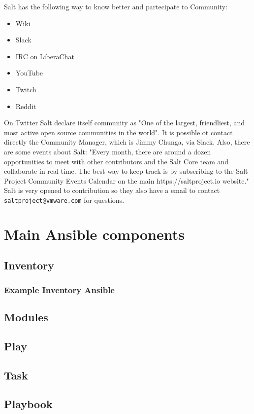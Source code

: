 \documentclass[12pt,a4paper,openright,twoside]{book}
\begin{document}
Salt has the following way to know better and partecipate to Community:
\begin{itemize}
    \item Wiki
    \item Slack
    \item IRC on LiberaChat
    \item YouTube
    \item Twitch
    \item Reddit
\end{itemize}
On Twitter Salt declare itself community as "One of the largest, friendliest, and most active open source communities in the world"\cite{saltTwitter}.
It is possible ot contact directly the Community Manager, which is Jimmy Chunga, via Slack.
Also, there are some events about Salt:
"Every month, there are around a dozen opportunities to meet with other contributors and the Salt Core team and collaborate in real time. The best way to keep track is by subscribing to the Salt Project Community Events Calendar on the main https://saltproject.io website."\cite{saltGitHub}
Salt is very opened to contribution so they also have a email to contact \texttt{saltproject@vmware.com} for questions.

\section{Main Ansible components}

\subsection{Inventory}

\subsubsection{Example Inventory Ansible}

\subsection{Modules}
\subsection{Play}
\subsection{Task}
\subsection{Playbook}
\end{document}
